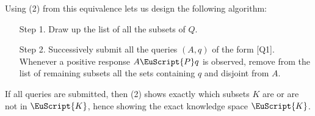 \documentclass[11pt,letterpaper,dvipsnames]{article}
\theoremstyle{definition}
\newcommand{\es}[1]{\EuScript{#1}}
\begin{document}
Using (2) from this equivalence lets us design the following algorithm:

\begin{enumerate}
    \item[Step 1.] Draw up the list of all the subsets of $Q$.
    \item[Step 2.] Successively submit all the queries $(A, q)$ of the form [Q1]. Whenever a positive response $A\es{P}q$ is observed, remove from the list of remaining subsets all the sets containing $q$ and disjoint from $A$.
\end{enumerate}

If all queries are submitted, then (2) shows exactly which subsets $K$ are or are not in $\es{K}$, hence showing the exact knowledge space $\es{K}$.





\end{document}
